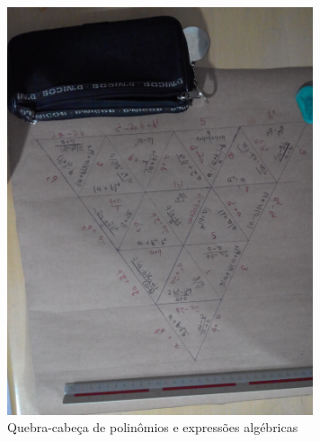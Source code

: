 \documentclass[english,ngerman,parskip=half]{scrartcl}
\begin{document}
\begin{itemize}
        \begin{figure}[ht!]
            \centering
            \includegraphics[width=90mm]{./images/qc-polinomial.jpg}
            \caption{Quebra-cabeça de polinômios e expressões algébricas\label{Quebra-cabeça de 'polinômios'}}
        \end{figure}

\end{itemize}
\end{document}
